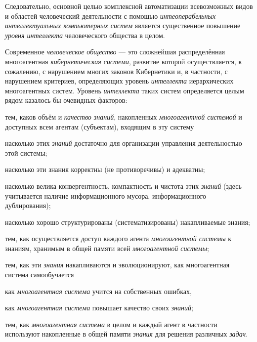 Следовательно, основной целью комплексной автоматизации всевозможных видов и областей человеческий деятельности с помощью \textit{интеоперабельных интеллектуальных компьютерных систем} является существенное повышение \textit{уровня интеллекта}  человеческого общества в целом.

Современное \textit{человеческое общество} --- это сложнейшая распределённая многоагентная \textit{кибернетическая система}, развитие которой осуществляется, к сожалению, с нарушением многих законов Кибернетики и, в частности, с нарушением критериев, определяющих уровень \textit{интеллекта} иерархических многоагентных систем. Уровень \textit{интеллекта} таких систем определяется целым рядом казалось бы очевидных факторов:
\begin{textitemize}
	\item тем, каков объём и \textit{качество знаний}, накопленных \textit{многоагентной системой} и доступных всем агентам (субъектам), входящим в эту систему
	\begin{textitemize}
		\item насколько этих \textit{знаний} достаточно для организации управления деятельностью этой системы;
		\item насколько эти знания корректны (не противоречивы) и адекватны;
		\item насколько велика конвергентность, компактность и чистота этих \textit{знаний} (здесь учитывается наличие информационного мусора, информационного дублирования);
		\item насколько хорошо структурированы (систематизированы) накапливаемые знания;
	\end{textitemize}
	\item тем, как осуществляется доступ каждого агента \textit{многоагентной системы} к знаниям, хранимым в общей памяти всей \textit{многоагентной системы};
	\medskip
	\item тем, как эти \textit{знания} накапливаются и эволюционируют, как многоагентная система самообучается
	\begin{textitemize}
		\item как \textit{многоагентная система} учится на собственных ошибках,
		\item как \textit{многоагентная система} повышает качество своих \textit{знаний};
	\end{textitemize}
	\item тем, как \textit{многоагентная система} в целом и каждый агент в частности используют накопленные в общей памяти \textit{знания} для решения различных \textit{задач}.
\end{textitemize}


